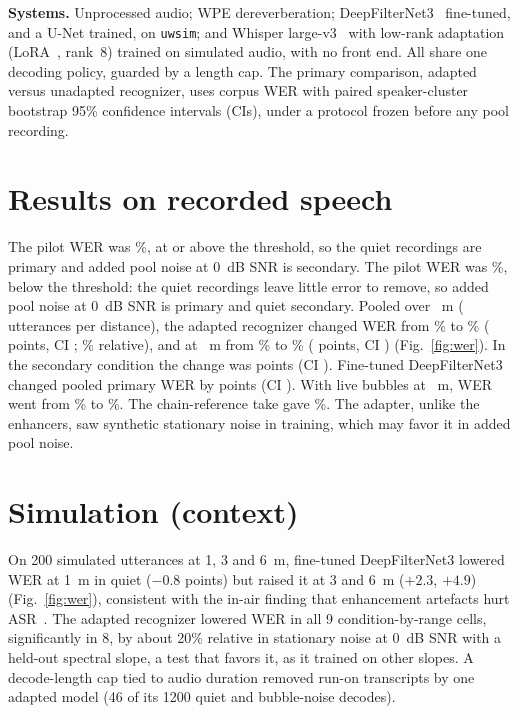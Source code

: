 \textbf{Systems.} Unprocessed audio; WPE dereverberation; DeepFilterNet3~\cite{schroeter2023} fine-tuned, and a U-Net trained, on \texttt{uwsim}; and Whisper
large-v3~\cite{radford2023} with low-rank adaptation (LoRA~\cite{hu2022}, rank~8) trained on simulated
audio, with no front end. All share one decoding policy, guarded by a length cap. The primary
comparison, adapted versus unadapted recognizer, uses corpus WER with paired speaker-cluster bootstrap
95\% confidence intervals (CIs), under a protocol frozen before any pool recording.

\section{Results on recorded speech}
\ifquietprimary
The pilot WER was \PilotWer\%, at or above the threshold, so the quiet
recordings are primary and added pool noise at 0~dB SNR is secondary.
\else
The pilot WER was \PilotWer\%, below the threshold: the quiet recordings
leave little error to remove, so added pool noise at 0~dB SNR is primary and quiet secondary.
\fi
Pooled over \DistList~m (\NUttsPerDist{} utterances per distance), the adapted recognizer changed WER
from \PrimWerCZeroAll\% to \PrimWerCEightAll\% (\PrimDWerAll{} points, CI \PrimDWerAllCI;
\PrimRelDWerAll\% relative), and at \FarDistM~m from \% to
\% ( points, CI )\ifrealfig{} (Fig.~\ref{fig:wer})\fi. In the
secondary condition the change was \SecDWerAll{} points (CI \SecDWerAllCI). Fine-tuned DeepFilterNet3
changed pooled primary WER by  points (CI ). With live
bubbles at \BubDistM~m, WER went from \% to
\%. The chain-reference take gave \ChainRefWer\%. The adapter, unlike
the enhancers, saw synthetic stationary noise in training, which may favor it in added pool noise.

\section{Simulation (context)}
On 200 simulated utterances at 1, 3 and 6~m, fine-tuned DeepFilterNet3 lowered WER at 1~m in quiet
($-0.8$ points) but raised it at 3 and 6~m ($+2.3$, $+4.9$)\ifrealfig\else{} (Fig.~\ref{fig:wer})\fi,
consistent with the in-air finding that enhancement artefacts hurt ASR~\cite{iwamoto2022}. The adapted recognizer lowered WER in all
9 condition-by-range cells, significantly in 8, by about 20\% relative in stationary noise at 0~dB SNR
with a held-out spectral slope, a test that favors it, as it trained on other slopes.
A decode-length cap tied to audio duration removed run-on transcripts by one adapted model (46 of its
1200 quiet and bubble-noise decodes).

